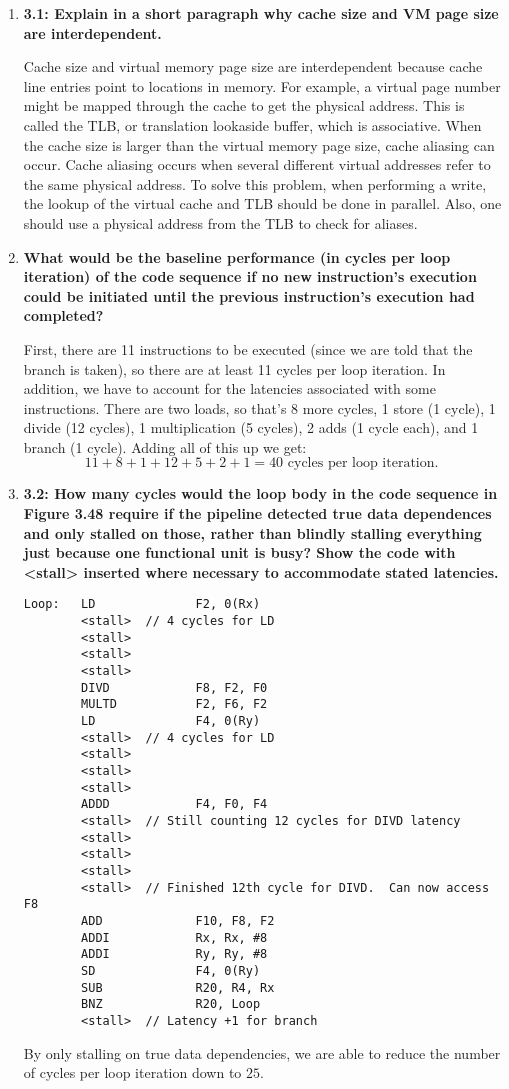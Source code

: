 \documentclass[10pt]{article} %
\begin{document}
\begin{enumerate}
\begin{itemize}
\end{itemize}

\item %
\textbf{3.1: Explain in a short paragraph why cache size and VM page size are interdependent. }

Cache size and virtual memory page size are interdependent because cache line entries point to locations in memory.  For example, a virtual page number might be mapped through the cache to get the physical address.  This is called the TLB, or translation lookaside buffer, which is associative.  When the cache size is larger than the virtual memory page size, cache aliasing can occur.  Cache aliasing occurs when several different virtual addresses refer to the same physical address.  To solve this problem, when performing a write, the lookup of the virtual cache and TLB should be done in parallel.  Also, one should use a physical address from the TLB to check for aliases.  

\item %
\textbf{What would be the baseline performance (in cycles per loop iteration) of the code sequence if no new instruction's execution could be initiated until the previous instruction's execution had completed? }

First, there are 11 instructions to be executed (since we are told that the branch is taken), so there are at least 11 cycles per loop iteration.  In addition, we have to account for the latencies associated with some instructions.  There are two loads, so that's 8 more cycles, 1 store (1 cycle), 1 divide (12 cycles), 1 multiplication (5 cycles), 2 adds (1 cycle each), and 1 branch (1 cycle).  Adding all of this up we get:
$$ 11 + 8 + 1 + 12 + 5 + 2 + 1 = 40 \text{ cycles per loop iteration. }$$

\item %
\textbf{3.2: How many cycles would the loop body in the code sequence in Figure 3.48 require if the pipeline detected true data dependences and only stalled on those, rather than blindly stalling everything just because one functional unit is busy?  Show the code with <stall> inserted where necessary to accommodate stated latencies. }

\begin{verbatim}
Loop:   LD              F2, 0(Rx)
        <stall>  // 4 cycles for LD
        <stall>
        <stall>
        <stall>
        DIVD            F8, F2, F0
        MULTD           F2, F6, F2
        LD              F4, 0(Ry)
        <stall>  // 4 cycles for LD
        <stall>
        <stall>
        <stall>
        ADDD            F4, F0, F4
        <stall>  // Still counting 12 cycles for DIVD latency
        <stall>
        <stall>
        <stall>
        <stall>  // Finished 12th cycle for DIVD.  Can now access F8
        ADD             F10, F8, F2
        ADDI            Rx, Rx, #8
        ADDI            Ry, Ry, #8
        SD              F4, 0(Ry)
        SUB             R20, R4, Rx
        BNZ             R20, Loop
        <stall>  // Latency +1 for branch
\end{verbatim}

By only stalling on true data dependencies, we are able to reduce the number of cycles per loop iteration down to $25$.  

\end{enumerate}
\end{document}
